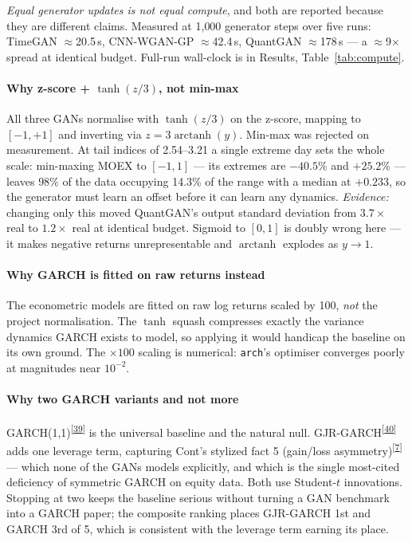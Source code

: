\documentclass[11pt,a4paper]{article}
\makeatletter
\newcommand{\tcite}[1]{\textsuperscript{[\hyperlink{R:#1}{#1}]}}
\DeclareRobustCommand{\_}{\ifmmode\nfss@text{\textunderscore}\else\textunderscore\allowbreak\fi}
\makeatother
\begin{document}
\textit{Equal generator updates is not equal compute}, and both are reported because they are different claims. Measured at 1{,}000 generator steps over five runs: TimeGAN $\approx$20.5\,s, CNN-WGAN-GP $\approx$42.4\,s, QuantGAN $\approx$178\,s --- a $\approx$9$\times$ spread at identical budget. Full-run wall-clock is in Results, Table~\ref{tab:compute}.

\paragraph{Why z-score + $\tanh(z/3)$, not min-max} All three GANs normalise with $\tanh(z/3)$ on the z-score, mapping to $[-1,+1]$ and inverting via $z = 3\operatorname{arctanh}(y)$. Min-max was rejected on measurement. At tail indices of 2.54--3.21 a single extreme day sets the whole scale: min-maxing MOEX to $[-1,1]$ --- its extremes are \(-40.5\%\) and \(+25.2\%\) --- leaves $98\%$ of the data occupying 14.3\% of the range with a median at \(+0.233\), so the generator must learn an offset before it can learn any dynamics. \textit{Evidence:} changing only this moved QuantGAN's output standard deviation from $3.7\times$ real to $1.2\times$ real at identical budget. Sigmoid to $[0,1]$ is doubly wrong here --- it makes negative returns unrepresentable and $\operatorname{arctanh}$ explodes as $y\to1$.

\paragraph{Why GARCH is fitted on raw returns instead} The econometric models are fitted on raw log returns scaled by 100, \emph{not} the project normalisation. The $\tanh$ squash compresses exactly the variance dynamics GARCH exists to model, so applying it would handicap the baseline on its own ground. The $\times100$ scaling is numerical: \texttt{arch}'s optimiser converges poorly at magnitudes near $10^{-2}$.

\paragraph{Why two GARCH variants and not more} GARCH(1,1)\tcite{39} is the universal baseline and the natural null. GJR-GARCH\tcite{40} adds one leverage term, capturing Cont's stylized fact 5 (gain/loss asymmetry)\tcite{7} --- which none of the GANs models explicitly, and which is the single most-cited deficiency of symmetric GARCH on equity data. Both use Student-$t$ innovations. Stopping at two keeps the baseline serious without turning a GAN benchmark into a GARCH paper; the composite ranking places GJR-GARCH 1st and GARCH 3rd of 5, which is consistent with the leverage term earning its place.
\end{document}
